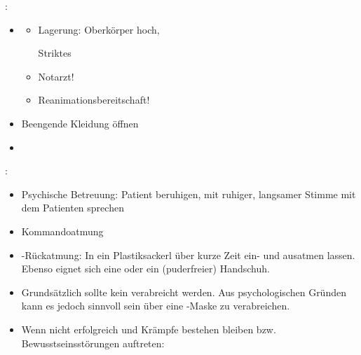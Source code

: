 {
: 

\begin{itemize}
  \item \TxMassVitMK
  \begin{itemize}
    \item Lagerung: Oberkörper hoch, 

    Striktes 
    \item  Notarzt!
    \item Reanimationsbereitschaft!
  \end{itemize}
  \item Beengende Kleidung öffnen
  \item {}
\end{itemize}
}


{ :

\begin{itemize}
  \item Psychische Betreuung: Patient beruhigen, mit ruhiger, langsamer Stimme
  mit dem Patienten sprechen
  \item Kommandoatmung
  \item {}-Rückatmung: In ein Plastiksackerl über kurze Zeit ein- und
  ausatmen lassen. Ebenso eignet sich eine  oder ein (puderfreier) 
  Handschuh.
  \item Grundsätzlich sollte kein   verabreicht werden. Aus
  psychologischen Gründen kann es jedoch sinnvoll sein  über eine -Maske zu
  verabreichen.
  \item Wenn nicht erfolgreich und Krämpfe bestehen bleiben bzw.
  Bewusstseinsstörungen auftreten: \TxMassVitMK 
\end{itemize}
}

